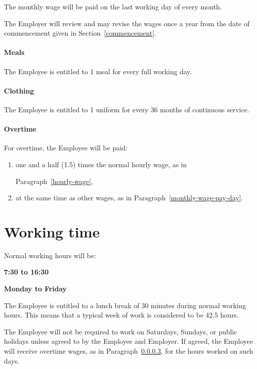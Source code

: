 \documentclass[a4paper,11pt]{article}
\begin{document}
\para\label{monthly-wage-pay-day} The monthly wage will be paid on the last
working day of every month.

\para The Employer will review and may revise the wages once a year from the
date of commencement given in Section~\ref{commencement}.

\paragraph{Meals} The Employee is entitled to 1 meal for every full working
day.

\paragraph{Clothing} The Employee is entitled to 1 uniform for every 36 months
of continuous service. 

\paragraph{Overtime}\label{overtime-wage} For overtime, the Employee will be
paid:

\begin{enumerate}
  \item one and a half (1.5) times the normal hourly wage, as in\par
    Paragraph~\ref{hourly-wage},
  \item at the same time as other wages, as in
    Paragraph~\ref{monthly-wage-pay-day}.
\end{enumerate}

\section{Working time}
\label{working-time}

\para Normal working hours will be:

\begin{center}
   \textbf{7:30 to 16:30}

   \textbf{Monday to Friday}
\end{center}

\para The Employee is entitled to a lunch break of 30 minutes during normal
working hours. This means that a typical week of work is considered to be 42.5
hours.

\para The Employee will not be required to work on Saturdays, Sundays, or
public holidays unless agreed to by the Employee and Employer. If agreed, the
Employee will receive overtime wages, as in Paragraph~\ref{overtime-wage}, for
the hours worked on such days.
\end{document}
